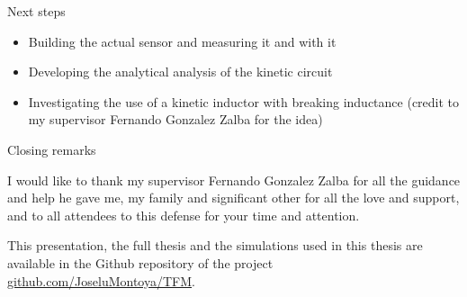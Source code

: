 \documentclass[../main.tex]{subfiles}
\begin{document}
%
%
%
\begin{frame}{Next steps}
\begin{itemize}
    \item Building the actual sensor and measuring it and with it
    \item Developing the analytical analysis of the kinetic circuit
    \item Investigating the use of a kinetic inductor with breaking inductance
        (credit to my supervisor Fernando Gonzalez Zalba for the idea)
\end{itemize}
\end{frame}

\begin{frame}{Closing remarks}
\begin{center}
    I would like to thank my supervisor Fernando Gonzalez Zalba for all the guidance
    and help he gave me, my family and significant other for all the love and
    support, and to all attendees to this defense for your time and attention.

    This presentation, the full thesis and the simulations used in this thesis
    are available in the Github repository of the project
    \href{https://github.com/JoseluMontoya/TFM}{github.com/JoseluMontoya/TFM}.
\end{center}
\end{frame}
\end{document}
